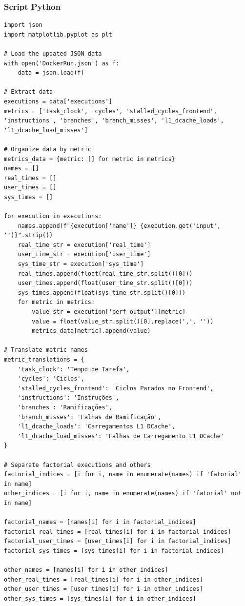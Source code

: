 \documentclass[12pt]{article}
\begin{document}
\subsubsection{Script Python}
\begin{verbatim}
import json
import matplotlib.pyplot as plt

# Load the updated JSON data
with open('DockerRun.json') as f:
    data = json.load(f)

# Extract data
executions = data['executions']
metrics = ['task_clock', 'cycles', 'stalled_cycles_frontend', 'instructions', 'branches', 'branch_misses', 'l1_dcache_loads', 'l1_dcache_load_misses']

# Organize data by metric
metrics_data = {metric: [] for metric in metrics}
names = []
real_times = []
user_times = []
sys_times = []

for execution in executions:
    names.append(f"{execution['name']} {execution.get('input', '')}".strip())
    real_time_str = execution['real_time']
    user_time_str = execution['user_time']
    sys_time_str = execution['sys_time']
    real_times.append(float(real_time_str.split()[0]))
    user_times.append(float(user_time_str.split()[0]))
    sys_times.append(float(sys_time_str.split()[0]))
    for metric in metrics:
        value_str = execution['perf_output'][metric]
        value = float(value_str.split()[0].replace(',', ''))
        metrics_data[metric].append(value)

# Translate metric names
metric_translations = {
    'task_clock': 'Tempo de Tarefa',
    'cycles': 'Ciclos',
    'stalled_cycles_frontend': 'Ciclos Parados no Frontend',
    'instructions': 'Instruções',
    'branches': 'Ramificações',
    'branch_misses': 'Falhas de Ramificação',
    'l1_dcache_loads': 'Carregamentos L1 DCache',
    'l1_dcache_load_misses': 'Falhas de Carregamento L1 DCache'
}

# Separate factorial executions and others
factorial_indices = [i for i, name in enumerate(names) if 'fatorial' in name]
other_indices = [i for i, name in enumerate(names) if 'fatorial' not in name]

factorial_names = [names[i] for i in factorial_indices]
factorial_real_times = [real_times[i] for i in factorial_indices]
factorial_user_times = [user_times[i] for i in factorial_indices]
factorial_sys_times = [sys_times[i] for i in factorial_indices]

other_names = [names[i] for i in other_indices]
other_real_times = [real_times[i] for i in other_indices]
other_user_times = [user_times[i] for i in other_indices]
other_sys_times = [sys_times[i] for i in other_indices]


\end{verbatim}
\end{document}
